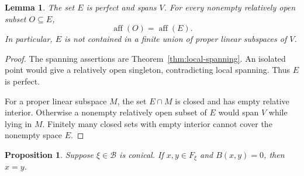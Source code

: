 \documentclass[11pt,reqno]{amsart}
\theoremstyle{plain}
\newtheorem{lemma}[theorem]{Lemma}
\newtheorem{proposition}[theorem]{Proposition}
\theoremstyle{definition}
\theoremstyle{remark}
\numberwithin{equation}{section}
\begin{document}
\begin{lemma}\label{lem:23-local-spanning}
The set $E$ is perfect and spans $V$. For every nonempty relatively open subset $O\subseteq E$,
\[
\operatorname{aff}(O)=\operatorname{aff}(E).
\]
In particular, $E$ is not contained in a finite union of proper linear subspaces of $V$.
\end{lemma}
\begin{proof}
The spanning assertions are Theorem~\ref{thm:local-spanning}. An isolated point would give a relatively open singleton, contradicting local spanning. Thus $E$ is perfect.

For a proper linear subspace $M$, the set $E\cap M$ is closed and has empty relative interior. Otherwise a nonempty relatively open subset of $E$ would span $V$ while lying in $M$. Finitely many closed sets with empty interior cannot cover the nonempty space $E$.
\end{proof}

\begin{proposition}\label{prop:32-conical}
Suppose $\xi\in\mathcal B$ is conical.
If $x,y\in F_\xi$ and $B(x,y)=0$, then $x=y$.
\end{proposition}
\end{document}
